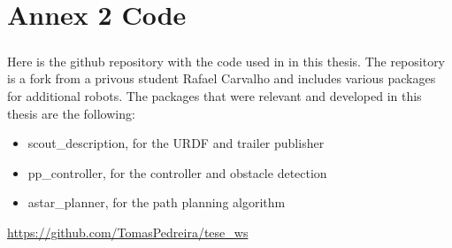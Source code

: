 
%

\chapter{Annex 2 Code}
\label{ann:annex2}

\paragraph{}Here is the github repository with the code used in in this thesis. 
The repository is a fork from a privous student Rafael Carvalho and includes 
various packages for additional robots. The packages that were relevant and developed 
in this thesis are the following:

\begin{itemize}
    \item scout\_description, for the \gls{URDF} and trailer publisher
    \item pp\_controller, for the controller and obstacle detection
    \item astar\_planner, for the path planning algorithm
\end{itemize}

\url{https://github.com/TomasPedreira/tese_ws}